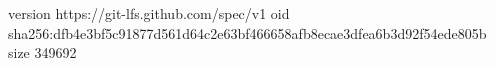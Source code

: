 version https://git-lfs.github.com/spec/v1
oid sha256:dfb4e3bf5c91877d561d64c2e63bf466658afb8ecae3dfea6b3d92f54ede805b
size 349692
